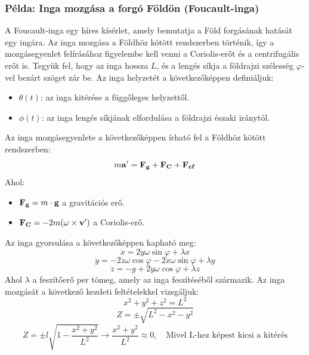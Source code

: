\documentclass[a4paper,12pt]{article}
\begin{document}
\subsubsection*{Példa: Inga mozgása a forgó Földön (Foucault-inga)}
A Foucault-inga egy híres kísérlet, amely bemutatja a Föld forgásának hatását egy ingára. Az inga mozgása a Földhöz kötött rendszerben történik, így a mozgásegyenlet felírásához figyelembe kell venni a Coriolis-erőt és a centrifugális
erőt is. Tegyük fel, hogy az inga hossza $L$, és a lengés síkja a földrajzi szélesség $\varphi$-vel bezárt szöget zár be. Az inga helyzetét a következőképpen definiáljuk:
\begin{itemize}
    \item $\theta(t)$: az inga kitérése a függőleges helyzettől.
    \item $\phi(t)$: az inga lengés síkjának elfordulása a földrajzi északi iránytól.
\end{itemize}
Az inga mozgásegyenlete a következőképpen írható fel a Földhöz kötött rendszerben:
\begin{equation}
    m\bold{a'} = \bold{F_g} + \bold{F_C} + \bold{F_{cf}}
\end{equation}
Ahol:
\begin{itemize}
    \item $\bold{F_g} = m\cdot \bold{g}$ a gravitációs erő.
    \item $\bold{F_C} = -2m(\bold{\omega} \times \bold{v'})$ a Coriolis-erő.
\end{itemize}
Az inga gyorsulása a következőképpen kapható meg:
\begin{equation}
    \ddot{x} = 2\dot{y}\omega\sin\varphi + \lambda x
\end{equation}
\begin{equation}
    \ddot{y} = -2\dot{z}\omega\cos\varphi -2\dot{x}\omega\sin\varphi + \lambda y
\end{equation}
\begin{equation}
    \ddot{z} = -g + 2 \dot{y}\omega\cos\varphi + \lambda z
\end{equation}
Ahol $\lambda$ a feszítőerő per tömeg, amely az inga feszítéséből származik. Az inga mozgását a következő kezdeti feltételekkel vizsgáljuk:
\begin{equation}
    x^2 + y^2 + z^2 = L^2
\end{equation}
\begin{equation}
    Z = \pm \sqrt{L^2 - x^2 - y^2}
\end{equation}
\begin{equation}
    Z = \pm l \sqrt{1 - \frac{x^2 + y^2}{L^2}} \rightarrow \frac{x^2 + y^2}{L^2} \approx 0, \quad \text{Mivel L-hez képest kicsi a kitérés}
\end{equation}
\end{document}
